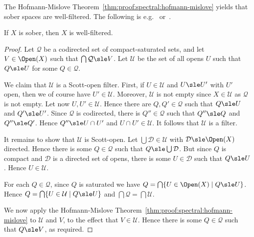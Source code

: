 The Hofmann-Mislove Theorem~\ref{thm:proof:spectral:hofmann-mislove}
yields that sober spaces are well-filtered.
The following is e.g.~\cite[Proposition 8.3.5]{goubault13book}
or~\cite[Corollary 7.2.11]{aj95chapter}.

\begin{proposition}
\label{prop:proof:spectral:wf}
If $X$ is sober, then $X$ is well-filtered.
\end{proposition}

\begin{proof}
Let $\mathcal{Q}$ be a codirected set of compact-saturated sets,
and let $V \in \Open(X)$ such that $\bigcap \mathcal{Q} \sle V$.
%
Let $\mathcal{U}$ be the set of all opens $U$ such that
$Q \sle U$ for some $Q \in \mathcal{Q}$.

We claim that $\mathcal{U}$ is a Scott-open filter.
First, if $U \in \mathcal{U}$ and $U \sle U'$ with $U'$ open,
then we of course have $U' \in \mathcal{U}$.
Moreover, $\mathcal{U}$ is not empty since $X \in \mathcal{U}$ 
as $\mathcal{Q}$ is not empty.
Let now $U, U' \in \mathcal{U}$.
Hence there are $Q, Q' \in \mathcal{Q}$ such that $Q \sle U$ and $Q' \sle U'$.
Since $\mathcal{Q}$ is codirected,
there is $Q'' \in \mathcal{Q}$ such that $Q'' \sle Q$ and $Q'' \sle Q'$.
Hence $Q'' \sle U \cap U'$ and $U \cap U' \in \mathcal{U}$.
It follows that $\mathcal{U}$ is a filter.

It remains to show that $\mathcal{U}$ is Scott-open.
Let $\bigcup \mathcal{D} \in \mathcal{U}$
with $\mathcal{D} \sle \Open(X)$ directed.
Hence there is some $Q \in \mathcal{Q}$ such that
$Q \sle \bigcup \mathcal{D}$.
But since $Q$ is compact and $\mathcal{D}$ is a directed set of opens,
there is some $U \in \mathcal{D}$ such that $Q \sle U$.
Hence $U \in \mathcal{U}$.

For each $Q \in \mathcal{Q}$, since $Q$ is saturated
we have $Q = \bigcap \{U \in \Open(X) \mid Q \sle U\}$.
Hence $Q = \bigcap \{U \in \mathcal{U} \mid Q \sle U\}$
and $\bigcap \mathcal{Q} = \bigcap \mathcal{U}$.

We now apply the Hofmann-Mislove Theorem~\ref{thm:proof:spectral:hofmann-mislove}
to $\mathcal{U}$ and $V$,
to the effect that $V \in \mathcal{U}$.
Hence there is some $Q \in \mathcal{Q}$ such that $Q \sle V$,
as required.
\end{proof}

